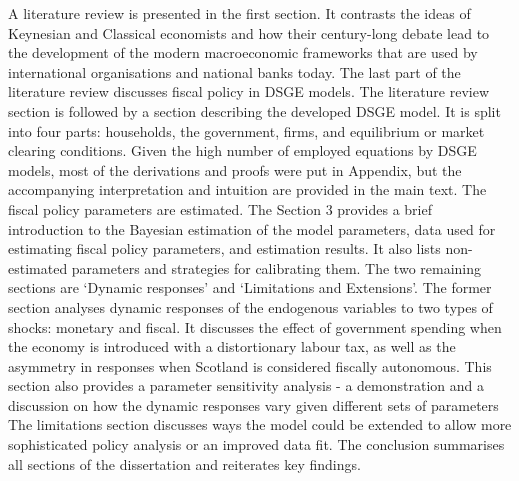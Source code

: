 A literature review is presented in the first section. It contrasts the ideas of Keynesian and Classical economists and how their century-long debate lead to the development of the modern macroeconomic frameworks that are used by international organisations and national banks today. The last part of the literature review discusses fiscal policy in DSGE models. The literature review section is followed by a section describing the developed DSGE model. It is split into four parts: households, the government, firms, and equilibrium or market clearing conditions. Given the high number of employed equations by DSGE models, most of the derivations and proofs were put in Appendix, but the accompanying interpretation and intuition are provided in the main text. The fiscal policy parameters are estimated. The Section 3 provides a brief introduction to the Bayesian estimation of the model parameters, data used for estimating fiscal policy parameters, and estimation results. It also lists non-estimated parameters and strategies for calibrating them. The two remaining sections are `Dynamic responses' and `Limitations and Extensions'. The former section analyses dynamic responses of the endogenous variables to two types of shocks: monetary and fiscal. It discusses the effect of government spending when the economy is introduced with a distortionary labour tax, as well as the asymmetry in responses when Scotland is considered fiscally autonomous. This section also provides a parameter sensitivity analysis - a demonstration and a discussion on how the dynamic responses vary given different sets of parameters The limitations section discusses ways the model could be extended to allow more sophisticated policy analysis or an improved data fit. The conclusion summarises all sections of the dissertation and reiterates key findings.